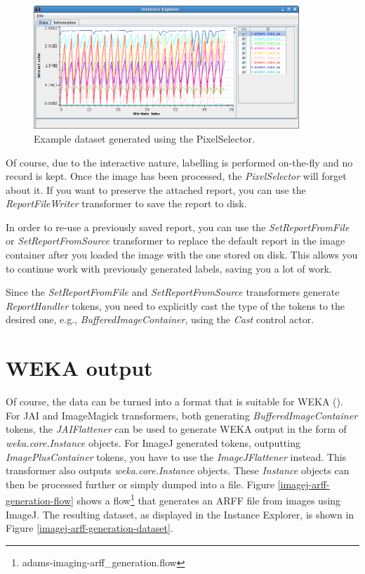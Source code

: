 \documentclass[a4paper]{book}
\begin{document}
\begin{figure}[htb]
  \centering
  \includegraphics[width=10.0cm]{images/pixelselector-dataset.png}
  \caption{Example dataset generated using the PixelSelector.}
  \label{pixelselector-dataset}
\end{figure}

Of course, due to the interactive nature, labelling is performed on-the-fly and
no record is kept. Once the image has been processed, the
\textit{PixelSelector} will forget about it. If you want to preserve the
attached report, you can use the \textit{ReportFileWriter} transformer to save
the report to disk. 

In order to re-use a previously saved report, you can use the
\textit{SetReportFromFile} or \textit{SetReportFromSource} transformer to
replace the default report in the image container after you loaded the image
with the one stored on disk. This allows you to continue work with previously
generated labels, saving you a lot of work.

Since the \textit{SetReportFromFile} and \textit{SetReportFromSource}
transformers generate \textit{ReportHandler} tokens, you need to explicitly
cast the type of the tokens to the desired one, e.g.,
\textit{BufferedImageContainer}, using the \textit{Cast} control actor.

\chapter{WEKA output}
Of course, the data can be turned into a format that is suitable for WEKA
(\cite{weka}). For JAI and ImageMagick transformers, both generating
\textit{BufferedImageContainer} tokens, the \textit{JAIFlattener} can be used to
generate WEKA output in the form of \textit{weka.core.Instance} objects.
For ImageJ generated tokens, outputting \textit{ImagePlusContainer} tokens, you
have to use the \textit{ImageJFlattener} instead. This transformer also outputs
\textit{weka.core.Instance} objects. These \textit{Instance} objects can then be
processed further or simply dumped into a file. Figure
\ref{imagej-arff-generation-flow} shows a
flow\footnote{adams-imaging-arff\_generation.flow} that generates an ARFF file
from images using ImageJ. The resulting dataset, as displayed in the Instance
Explorer, is shown in Figure \ref{imagej-arff-generation-dataset}.
\end{document}
